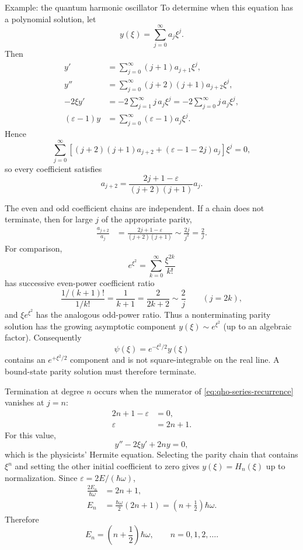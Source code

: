 \documentclass[11pt]{beamer}
\begin{document}
\begin{frame}[allowframebreaks]{Example: the quantum harmonic oscillator}
To determine when this equation has a polynomial solution, let
\[
  y(\xi)=\sum_{j=0}^{\infty}a_j\xi^j.
\]
Then
\begin{align*}
  y'
    &=\sum_{j=0}^{\infty}(j+1)a_{j+1}\xi^j,\\
  y''
    &=\sum_{j=0}^{\infty}(j+2)(j+1)a_{j+2}\xi^j,\\
  -2\xi y'
    &=-2\sum_{j=1}^{\infty}j\,a_j\xi^j
      =-2\sum_{j=0}^{\infty}j\,a_j\xi^j,\\
  (\varepsilon-1)y
    &=\sum_{j=0}^{\infty}(\varepsilon-1)a_j\xi^j.
\end{align*}
Hence
\[
  \sum_{j=0}^{\infty}
  \left[
    (j+2)(j+1)a_{j+2}
    +(\varepsilon-1-2j)a_j
  \right]\xi^j=0,
\]
so every coefficient satisfies
\begin{equation}
  a_{j+2}
    =\frac{2j+1-\varepsilon}{(j+2)(j+1)}a_j.
  \label{eq:qho-series-recurrence}
\end{equation}

The even and odd coefficient chains are independent.  If a chain does not
terminate, then for large $j$ of the appropriate parity,
\begin{align*}
  \frac{a_{j+2}}{a_j}
   &=
    \frac{2j+1-\varepsilon}{(j+2)(j+1)}
    \sim\frac{2j}{j^2}
    =\frac{2}{j}.
\end{align*}
For comparison,
\[
  e^{\xi^2}
    =\sum_{k=0}^{\infty}\frac{\xi^{2k}}{k!}
\]
has successive even-power coefficient ratio
\[
  \frac{1/(k+1)!}{1/k!}
   =\frac{1}{k+1}
   =\frac{2}{2k+2}
   \sim\frac{2}{j}
   \qquad (j=2k),
\]
and $\xi e^{\xi^2}$ has the analogous odd-power ratio.  Thus a
nonterminating parity solution has the growing asymptotic component
$y(\xi)\sim e^{\xi^2}$ (up to an algebraic factor).  Consequently
\[
  \psi(\xi)=e^{-\xi^2/2}y(\xi)
\]
contains an $e^{+\xi^2/2}$ component and is not square-integrable on the real
line.  A bound-state parity solution must therefore terminate.

Termination at degree $n$ occurs when the numerator of
\eqref{eq:qho-series-recurrence} vanishes at $j=n$:
\begin{align*}
  2n+1-\varepsilon&=0,\\
  \varepsilon&=2n+1.
\end{align*}
For this value,
\[
  y''-2\xi y'+2ny=0,
\]
which is the physicists' Hermite equation.  Selecting the parity chain that
contains $\xi^n$ and setting the other initial coefficient to zero gives
$y(\xi)=H_n(\xi)$ up to normalization.  Since
$\varepsilon=2E/(\hbar\omega)$,
\begin{align*}
  \frac{2E_n}{\hbar\omega}
    &=2n+1,\\
  E_n
    &=\frac{\hbar\omega}{2}(2n+1)
      =\left(n+\frac12\right)\hbar\omega.
\end{align*}
Therefore
\begin{equation}
  E_n=\left(n+\frac12\right)\hbar\omega,
  \qquad n=0,1,2,\ldots .
  \label{eq:energy-levels}
\end{equation}


\end{frame}
\end{document}
